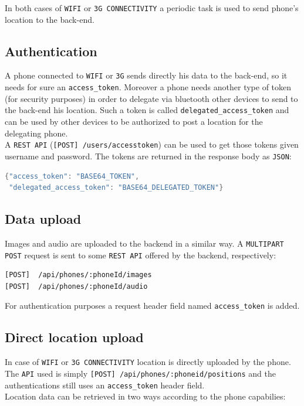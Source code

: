 \documentclass[conference]{IEEEtran}
\begin{document}
In both cases of \texttt{WIFI} or \texttt{3G CONNECTIVITY} a periodic task is used to send phone's location to the back-end.

\subsection{Authentication}
A phone connected to \texttt{WIFI} or \texttt{3G} sends directly his data to the back-end, so it needs for sure an \texttt{access\_token}. Moreover a phone needs another type of token (for security purposes) in order to delegate via bluetooth other devices to send to the back-end his location. Such a token is called \texttt{delegated\_access\_token} and can be used by other devices to be authorized to post a location for the delegating phone.\\
A \texttt{REST API} (\texttt{[POST] /users/accesstoken}) can be used to get those tokens given username and password. The tokens are returned in the response body as \texttt{JSON}:

\begin{lstlisting}[language=Java, caption=Response body containing tokens]
{"access_token": "BASE64_TOKEN",
 "delegated_access_token": "BASE64_DELEGATED_TOKEN"}
\end{lstlisting}

\subsection{Data upload}
Images and audio are uploaded to the backend in a similar way. A \texttt{MULTIPART POST} request is sent to some \texttt{REST API} offered by the backend, respectively:

\begin{lstlisting}[caption=REST API to upload images and audio]
[POST]	/api/phones/:phoneId/images
[POST] 	/api/phones/:phoneId/audio
\end{lstlisting}

For authentication purposes a request header field named \texttt{access\_token} is added.

\subsection{Direct location upload}
In case of \texttt{WIFI} or \texttt{3G CONNECTIVITY} location is directly uploaded by the phone. The \texttt{API} used is simply \texttt{[POST] /api/phones/:phoneid/positions} and the authentications still uses an \texttt{access\_token} header field.\\
Location data can be retrieved in two ways according to the phone capabilies:\\
\end{document}
